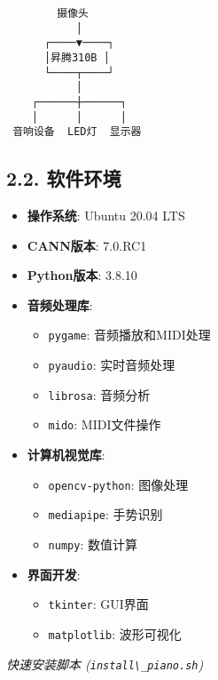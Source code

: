 \begin{lstlisting}
        摄像头
           │
      ┌────▼────┐
      │昇腾310B │
      └────┬────┘
           │
    ┌──────┼──────┐
    │      │      │
 音响设备  LED灯  显示器
\end{lstlisting}

\subsection{2.2. 软件环境}\label{ux8f6fux4ef6ux73afux5883}

\begin{itemize}
\tightlist
\item
  \textbf{操作系统}: Ubuntu 20.04 LTS
\item
  \textbf{CANN版本}: 7.0.RC1
\item
  \textbf{Python版本}: 3.8.10
\item
  \textbf{音频处理库}:

  \begin{itemize}
  \tightlist
  \item
    \passthrough{\lstinline!pygame!}: 音频播放和MIDI处理
  \item
    \passthrough{\lstinline!pyaudio!}: 实时音频处理
  \item
    \passthrough{\lstinline!librosa!}: 音频分析
  \item
    \passthrough{\lstinline!mido!}: MIDI文件操作
  \end{itemize}
\item
  \textbf{计算机视觉库}:

  \begin{itemize}
  \tightlist
  \item
    \passthrough{\lstinline!opencv-python!}: 图像处理
  \item
    \passthrough{\lstinline!mediapipe!}: 手势识别
  \item
    \passthrough{\lstinline!numpy!}: 数值计算
  \end{itemize}
\item
  \textbf{界面开发}:

  \begin{itemize}
  \tightlist
  \item
    \passthrough{\lstinline!tkinter!}: GUI界面
  \item
    \passthrough{\lstinline!matplotlib!}: 波形可视化
  \end{itemize}
\end{itemize}

\emph{快速安装脚本 (\passthrough{\lstinline!install\_piano.sh!})}

